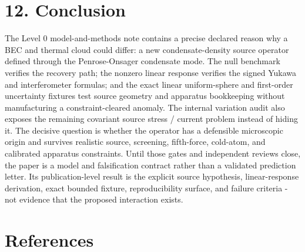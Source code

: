 \documentclass[
  american,
  11pt,
  letterpaper,
]{article}
\begin{document}
\section{12. Conclusion}\label{conclusion}

The Level 0 model-and-methods note contains a precise declared reason why a BEC and thermal cloud could differ: a new condensate-density source operator defined through the Penrose-Onsager condensate mode. The null benchmark verifies the recovery path; the nonzero linear response verifies the signed Yukawa and interferometer formulas; and the exact linear uniform-sphere and first-order uncertainty fixtures test source geometry and apparatus bookkeeping without manufacturing a constraint-cleared anomaly. The internal variation audit also exposes the remaining covariant source stress / current problem instead of hiding it. The decisive question is whether the operator has a defensible microscopic origin and survives realistic source, screening, fifth-force, cold-atom, and calibrated apparatus constraints. Until those gates and independent reviews close, the paper is a model and falsification contract rather than a validated prediction letter. Its publication-level result is the explicit source hypothesis, linear-response derivation, exact bounded fixture, reproducibility surface, and failure criteria - not evidence that the proposed interaction exists.

\section{References}\label{references}
\end{document}
